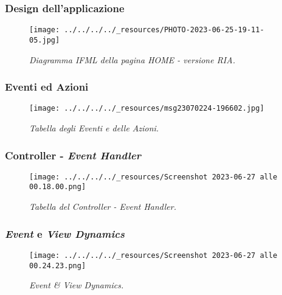 \pagebreak

\hypertarget{design-dellapplicazione-1}{%
\subsubsection{Design
dell'applicazione}\label{design-dellapplicazione-1}}

\begin{figure}
\centering
\texttt{[image: ../../../../\_resources/PHOTO-2023-06-25-19-11-05.jpg]}
\caption{\emph{Diagramma IFML della pagina HOME - versione RIA.}}
\end{figure}

\pagebreak

\hypertarget{eventi-ed-azioni}{%
\subsubsection{Eventi ed Azioni}\label{eventi-ed-azioni}}

\begin{figure}
\centering
\texttt{[image: ../../../../\_resources/msg23070224-196602.jpg]}
\caption{\emph{Tabella degli Eventi e delle Azioni.}}
\end{figure}

\pagebreak

\hypertarget{controller---event-handler}{%
\subsubsection{\texorpdfstring{Controller - \emph{Event
Handler}}{Controller - Event Handler}}\label{controller---event-handler}}

\begin{figure}
\centering
\texttt{[image: ../../../../\_resources/Screenshot 2023-06-27 alle 00.18.00.png]}
\caption{\emph{Tabella del Controller - Event Handler.}}
\end{figure}

\pagebreak

\hypertarget{event-e-view-dynamics}{%
\subsubsection{\texorpdfstring{\emph{Event} e \emph{View
Dynamics}}{Event e View Dynamics}}\label{event-e-view-dynamics}}

\begin{figure}
\centering
\texttt{[image: ../../../../\_resources/Screenshot 2023-06-27 alle 00.24.23.png]}
\caption{\emph{Event \& View Dynamics.}}
\end{figure}


